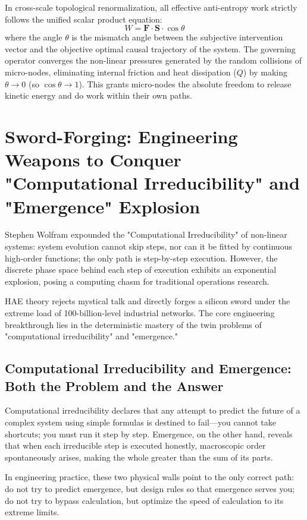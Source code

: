 \documentclass[11pt,a4paper]{article}
\begin{document}
In cross-scale topological renormalization, all effective anti-entropy work strictly follows the unified scalar product equation:
\begin{equation}
    W = \mathbf{F} \cdot \mathbf{S} \cdot \cos \theta
\end{equation}
where the angle $\theta$ is the mismatch angle between the subjective intervention vector and the objective optimal causal trajectory of the system. The governing operator converges the non-linear pressures generated by the random collisions of micro-nodes, eliminating internal friction and heat dissipation ($Q$) by making $\theta \to 0$ (so $\cos\theta \to 1$). This grants micro-nodes the absolute freedom to release kinetic energy and do work within their own paths.

\section{Sword-Forging: Engineering Weapons to Conquer "Computational Irreducibility" and "Emergence" Explosion}

Stephen Wolfram expounded the "Computational Irreducibility" of non-linear systems: system evolution cannot skip steps, nor can it be fitted by continuous high-order functions; the only path is step-by-step execution. However, the discrete phase space behind each step of execution exhibits an exponential explosion, posing a computing chasm for traditional operations research.

HAE theory rejects mystical talk and directly forges a silicon sword under the extreme load of 100-billion-level industrial networks. The core engineering breakthrough lies in the deterministic mastery of the twin problems of "computational irreducibility" and "emergence."

\subsection{Computational Irreducibility and Emergence: Both the Problem and the Answer}
Computational irreducibility declares that any attempt to predict the future of a complex system using simple formulas is destined to fail—you cannot take shortcuts; you must run it step by step. Emergence, on the other hand, reveals that when each irreducible step is executed honestly, macroscopic order spontaneously arises, making the whole greater than the sum of its parts.

In engineering practice, these two physical walls point to the only correct path: do not try to predict emergence, but design rules so that emergence serves you; do not try to bypass calculation, but optimize the speed of calculation to its extreme limits.
\end{document}
